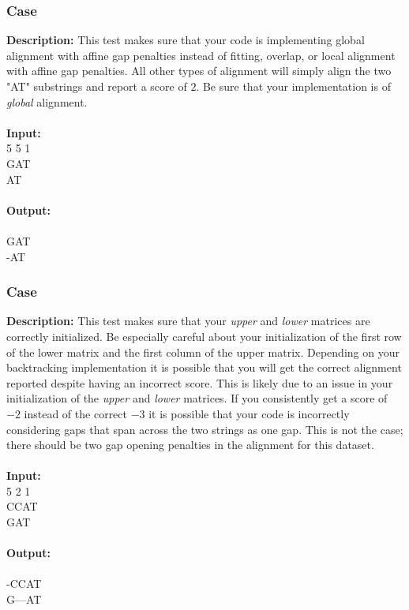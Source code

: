 \documentclass{article}
\newcommand{\code}[1]{{\fontfamily{pcr}\selectfont #1}}
\begin{document}
\subsubsection*{Case }
\hline \vspace{5}
\textbf{Description:} This test makes sure that your code is implementing global alignment with affine gap penalties instead of fitting, overlap, or local alignment with affine gap penalties. All other types of alignment will simply align the two "AT" substrings and report a score of $2$. Be sure that your implementation is of \emph{global} alignment.\\ \\
\noindent \textbf{Input:}\\
\code{1 5 5 1\\GAT\\AT}\\ \\
\noindent \textbf{Output:}\\
\code{-3\\GAT\\-AT}

\subsubsection*{Case }
\hline \vspace{5}
\textbf{Description:} This test makes sure that your \emph{upper} and \emph{lower} matrices are correctly initialized. Be especially careful about your initialization of the first row of the lower matrix and the first column of the upper matrix. Depending on your backtracking implementation it is possible that you will get the correct alignment reported despite having an incorrect score. This is likely due to an issue in your initialization of the \emph{upper} and \emph{lower} matrices. If you consistently get a score of $-2$ instead of the correct $-3$ it is possible that your code is incorrectly considering gaps that span across the two strings as one gap. This is not the case; there should be two gap opening penalties in the alignment for this dataset.\\ \\
\noindent \textbf{Input:}\\
\code{1 5 2 1\\CCAT\\GAT}\\ \\
\noindent \textbf{Output:}\\
\code{-3\\-CCAT\\G---AT}
\pagebreak
\end{document}
